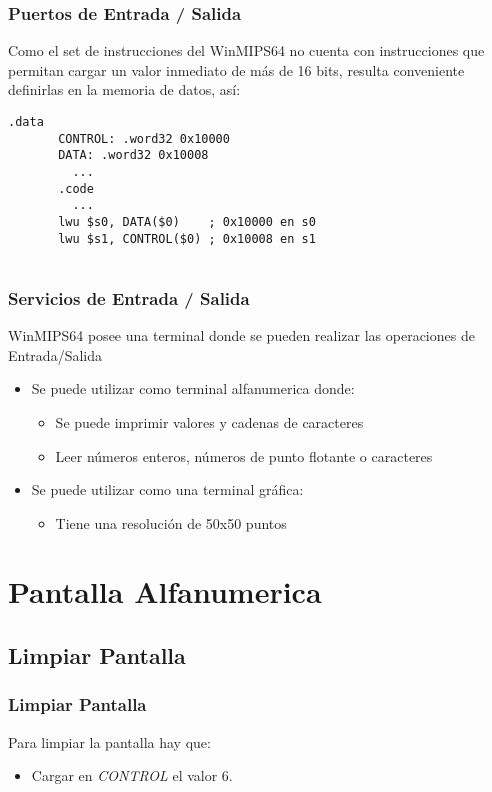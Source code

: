 \documentclass{beamer}
\begin{document}
\begin{frame}[fragile]
\frametitle{Puertos de Entrada / Salida}

Como el set de instrucciones del WinMIPS64 no cuenta con instrucciones que permitan cargar un valor inmediato de más de 16 bits, resulta conveniente definirlas en la memoria de datos, así:

\begin{block}{}
\begin{lstlisting}[language=WinMIPS64,basicstyle=\ttfamily,keywordstyle=\color{blue}]
       .data
       CONTROL: .word32 0x10000
       DATA: .word32 0x10008
         ...
       .code
         ...
       lwu $s0, DATA($0)    ; 0x10000 en s0
       lwu $s1, CONTROL($0) ; 0x10008 en s1
	   
\end{lstlisting}
\end{block}
\end{frame}


\begin{frame}
\frametitle{Servicios de Entrada / Salida}

WinMIPS64 posee una terminal donde se pueden realizar las operaciones de Entrada/Salida

\begin{itemize}
\item Se puede utilizar como terminal alfanumerica donde:

\begin{itemize}
\item Se puede imprimir valores y cadenas de caracteres
\item Leer números enteros, números de punto flotante o caracteres
\end{itemize}

\item Se puede utilizar como una terminal gráfica:
\begin{itemize}
\item Tiene una resolución de 50x50 puntos
\end{itemize}

\end{itemize}
\end{frame}


\section{Pantalla Alfanumerica}

\subsection{Limpiar Pantalla}
\begin{frame}
\frametitle{Limpiar Pantalla}
Para limpiar la pantalla hay que:
\begin{itemize}
\item Cargar en \emph{CONTROL} el valor 6.
\end{itemize}
\end{frame}
\end{document}
